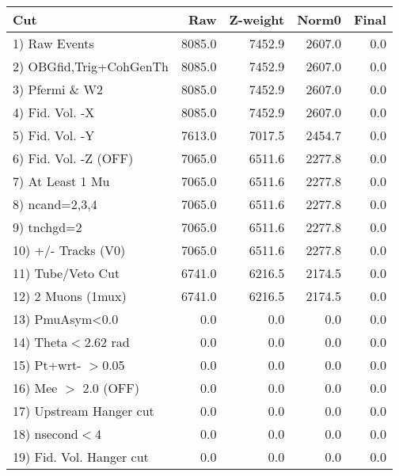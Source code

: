  \begin{table}[h!]\centering
 \begin{tabular}{||l||r|r|r|r||}
 \hline
 \hline
 Cut & Raw & Z-weight & Norm0 & Final \\
 \hline
  1) Raw Events           &      8085.0 &      7452.9 &      2607.0 &         0.0 \\
  2) OBGfid,Trig+CohGenTh &      8085.0 &      7452.9 &      2607.0 &         0.0 \\
  3) Pfermi \& W2         &      8085.0 &      7452.9 &      2607.0 &         0.0 \\
  4) Fid. Vol. -X         &      8085.0 &      7452.9 &      2607.0 &         0.0 \\
  5) Fid. Vol. -Y         &      7613.0 &      7017.5 &      2454.7 &         0.0 \\
  6) Fid. Vol. -Z (OFF)   &      7065.0 &      6511.6 &      2277.8 &         0.0 \\
  7) At Least 1 Mu        &      7065.0 &      6511.6 &      2277.8 &         0.0 \\
  8) ncand=2,3,4          &      7065.0 &      6511.6 &      2277.8 &         0.0 \\
  9) tnchgd=2             &      7065.0 &      6511.6 &      2277.8 &         0.0 \\
 10) +/- Tracks (V0)      &      7065.0 &      6511.6 &      2277.8 &         0.0 \\
 11) Tube/Veto Cut        &      6741.0 &      6216.5 &      2174.5 &         0.0 \\
 12) 2 Muons (1mux)       &      6741.0 &      6216.5 &      2174.5 &         0.0 \\
 13) PmuAsym<0.0          &         0.0 &         0.0 &         0.0 &         0.0 \\
 14) Theta$<$2.62 rad     &         0.0 &         0.0 &         0.0 &         0.0 \\
 15) Pt+wrt- $>$0.05      &         0.0 &         0.0 &         0.0 &         0.0 \\
 16) Mee $>$ 2.0  (OFF)   &         0.0 &         0.0 &         0.0 &         0.0 \\
 17) Upstream Hanger cut  &         0.0 &         0.0 &         0.0 &         0.0 \\
 18) nsecond$<$4          &         0.0 &         0.0 &         0.0 &         0.0 \\
 19) Fid. Vol. Hanger cut &         0.0 &         0.0 &         0.0 &         0.0 \\

\end{tabular}
\end{table}

